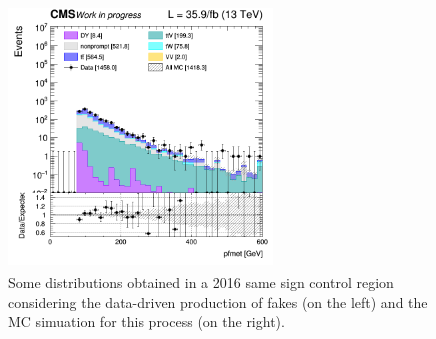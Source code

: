 \documentclass[a4paper, 10pt, openright]{report}
\begin{document}
\begin{figure}[htbp]
\begin{center}
{\begin{minipage}[b]{.48\textwidth}
\end{minipage} \hfill
\begin{minipage}[b]{.48\textwidth}
\includegraphics[width=7cm, height=7cm]{figs/log_cratio_SSCR_ll_pfmet_MC.png}
\end{minipage} \hfill
 }
 \caption{Some distributions obtained in a 2016 same sign control region considering the data-driven production of fakes (on the left) and the \ac{MC} simuation for this process (on the right).}
\label{fig:FakesComparison}
\end{center}
\end{figure}

%
%
\end{document}
